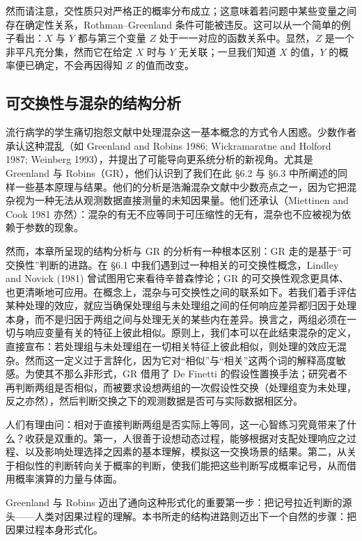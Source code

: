 然而请注意，交性质只对严格正的概率分布成立；这意味着若问题中某些变量之间存在确定性关系，Rothman–Greenland 条件可能被违反。这可以从一个简单的例子看出：$X$ 与 $Y$ 都与第三个变量 $Z$ 处于一一对应的函数关系中。显然，$Z$ 是一个非平凡充分集，然而它在给定 $X$ 时与 $Y$ 无关联；一旦我们知道 $X$ 的值，$Y$ 的概率便已确定，不会再因得知 $Z$ 的值而改变。

\subsection{可交换性与混杂的结构分析}

流行病学的学生痛切抱怨文献中处理混杂这一基本概念的方式令人困惑。少数作者承认这种混乱（如 Greenland and Robins 1986; Wickramaratne and Holford 1987; Weinberg 1993），并提出了可能导向更系统分析的新视角。尤其是 Greenland 与 Robins（GR），他们认识到了我们在此 \S 6.2 与 \S 6.3 中所阐述的同样一些基本原理与结果。他们的分析是浩瀚混杂文献中少数亮点之一，因为它把混杂视为一种无法从观测数据直接测量的未知因果量。他们还承认（Miettinen and Cook 1981 亦然）：混杂的有无不应等同于可压缩性的无有，混杂也不应被视为依赖于参数的现象。

然而，本章所呈现的结构分析与 GR 的分析有一种根本区别：GR 走的是基于“可交换性”判断的进路。在 \S 6.1 中我们遇到过一种相关的可交换性概念，Lindley and Novick (1981) 曾试图用它来看待辛普森悖论；GR 的可交换性观念更具体、也更清晰地可应用。在概念上，混杂与可交换性之间的联系如下。若我们着手评估某种处理的效应，就应当确保处理组与未处理组之间的任何响应差异都归因于处理本身，而不是归因于两组之间与处理无关的某些内在差异。换言之，两组必须在一切与响应变量有关的特征上彼此相似。原则上，我们本可以在此结束混杂的定义，直接宣布：若处理组与未处理组在一切相关特征上彼此相似，则处理的效应无混杂。然而这一定义过于言辞化，因为它对“相似”与“相关”这两个词的解释高度敏感。为使其不那么非形式，GR 借用了 De Finetti 的假设性置换手法；研究者不再判断两组是否相似，而被要求设想两组的一次假设性交换（处理组变为未处理，反之亦然），然后判断交换之下的观测数据是否可与实际数据相区分。

人们有理由问：相对于直接判断两组是否实际上等同，这一心智练习究竟带来了什么？收获是双重的。第一，人很善于设想动态过程，能够根据对支配处理响应之过程、以及影响处理选择之因素的基本理解，模拟这一交换场景的结果。第二，从关于相似性的判断转向关于概率的判断，使我们能把这些判断写成概率记号，从而借用概率演算的力量与体面。

Greenland 与 Robins 迈出了通向这种形式化的重要第一步：把记号拉近判断的源头——人类对因果过程的理解。本书所走的结构进路则迈出下一个自然的步骤：把因果过程本身形式化。

